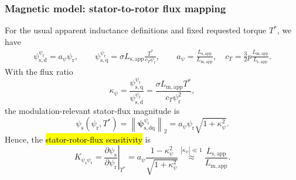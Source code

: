 \begin{frame}
    \frametitle{Magnetic model: stator-to-rotor flux mapping}
    For the usual apparent inductance definitions and fixed requested torque $T^*$, we have
    \begin{equation}
        \begin{gathered}
            \psi_{\mathrm{s,d}}^{\psi_{\mathrm r}}=a_\psi\psi_{\mathrm r},
            \qquad
            \psi_{\mathrm{s,q}}^{\psi_{\mathrm r}}=\sigma L_{\mathrm{s,app}}\frac{T^*}{c_T\psi_{\mathrm r}},
            \qquad
            a_\psi=\frac{L_{\mathrm{s,app}}}{L_{\mathrm{m,app}}},
            \quad
            c_T=\frac{3}{2}p\frac{L_{\mathrm{m,app}}}{L_{\mathrm{r,app}}}.
        \end{gathered}
        \label{eq:IM_mod_v06_linear_flux_components}
    \end{equation}\pause%
    With the flux ratio
    \begin{equation}
        \kappa_\psi
        =\frac{\psi_{\mathrm{s,q}}^{\psi_{\mathrm r}}}{\psi_{\mathrm{s,d}}^{\psi_{\mathrm r}}}
        =\frac{\sigma L_{\mathrm{m,app}}T^*}{c_T\psi_{\mathrm r}^{2}},
        \label{eq:IM_mod_v06_kappa_def}
    \end{equation}\pause%
    the modulation-relevant stator-flux magnitude is
    \begin{equation}
        \psi_{\mathrm{s}}(\psi_{\mathrm r},T^*)
        =\left\|\bm{\psi}_{\mathrm{s,dq}}^{\psi_{\mathrm r}}\right\|_2
        =a_\psi\psi_{\mathrm r}\sqrt{1+\kappa_\psi^2} .
        \label{eq:IM_mod_v06_linear_psis_map}
    \end{equation}\pause%
    Hence, the \hl{stator-rotor-flux sensitivity} is
    \begin{equation}
        K_{\psi_{\mathrm{s}}\psi_{\mathrm r}}
        =\left.\frac{\partial\psi_{\mathrm{s}}}{\partial\psi_{\mathrm r}}\right|_{T^*}
        =a_\psi\frac{1-\kappa_\psi^2}{\sqrt{1+\kappa_\psi^2}}
        \stackrel{|\kappa_\psi|\ll 1}{\approx} \frac{L_{\mathrm{s,app}}}{L_{\mathrm{m,app}}} .
        \label{eq:IM_mod_v06_linear_sensitivity}
    \end{equation}
\end{frame}


